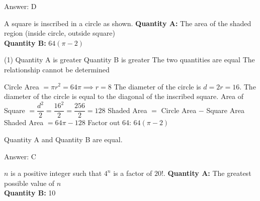 \documentclass[11pt,paper=a4,answers]{exam}
\begin{document}
\begin{questions}
\begin{solution}
Answer: \colorbox{yellow!100}{D}
\end{solution}

\vspace{1cm}

\question
\begin{center}
\end{center}
A square is inscribed in a circle as shown.
\vspace{5pt}
\textbf{Quantity A: } The area of the shaded region (inside circle, outside square) \\
\vspace{5pt}
\textbf{Quantity B: } $64(\pi - 2)$

\begin{tasks}(1)
\task[A)] Quantity A is greater
\task[B)] Quantity B is greater
\task[C)] The two quantities are equal
\task[D)] The relationship cannot be determined
\end{tasks}

\begin{solution}
\begin{center}
Circle Area $= \pi r^2 = 64\pi \implies r = 8$
\vspace{5pt}
The diameter of the circle is $d = 2r = 16$.
\vspace{5pt}
The diameter of the circle is equal to the diagonal of the inscribed square.
\vspace{5pt}
Area of Square $= \dfrac{d^2}{2} = \dfrac{16^2}{2} = \dfrac{256}{2} = 128$
\vspace{5pt}
Shaded Area $=$ Circle Area $-$ Square Area
\vspace{5pt}
Shaded Area $= 64\pi - 128$
\vspace{5pt}
Factor out 64: $64(\pi - 2)$
\end{center}
\vspace{5pt}
Quantity A and Quantity B are equal.

Answer: \colorbox{yellow!100}{C}
\end{solution}

\vspace{1cm}

\question
$n$ is a positive integer such that $4^n$ is a factor of $20!$.
\vspace{5pt}
\textbf{Quantity A: } The greatest possible value of $n$ \\
\vspace{5pt}
\textbf{Quantity B: } 10


\end{questions}
\end{document}
